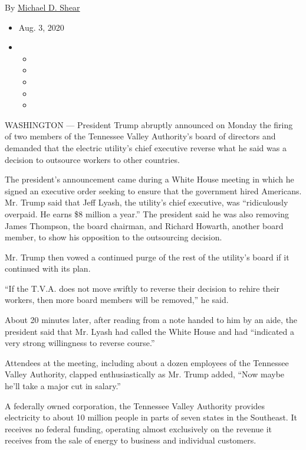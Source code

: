 By \href{https://www.nytimes3xbfgragh.onion/by/michael-d-shear}{Michael
D. Shear}

\begin{itemize}
\item
  Aug. 3, 2020
\item
  \begin{itemize}
  \item
  \item
  \item
  \item
  \item
  \end{itemize}
\end{itemize}

WASHINGTON --- President Trump abruptly announced on Monday the firing
of two members of the Tennessee Valley Authority's board of directors
and demanded that the electric utility's chief executive reverse what he
said was a decision to outsource workers to other countries.

The president's announcement came during a White House meeting in which
he signed an executive order seeking to ensure that the government hired
Americans. Mr. Trump said that Jeff Lyash, the utility's chief
executive, was ``ridiculously overpaid. He earns \$8 million a year.''
The president said he was also removing James Thompson, the board
chairman, and Richard Howarth, another board member, to show his
opposition to the outsourcing decision.

Mr. Trump then vowed a continued purge of the rest of the utility's
board if it continued with its plan.

``If the T.V.A. does not move swiftly to reverse their decision to
rehire their workers, then more board members will be removed,'' he
said.

About 20 minutes later, after reading from a note handed to him by an
aide, the president said that Mr. Lyash had called the White House and
had ``indicated a very strong willingness to reverse course.''

Attendees at the meeting, including about a dozen employees of the
Tennessee Valley Authority, clapped enthusiastically as Mr. Trump added,
``Now maybe he'll take a major cut in salary.''

A federally owned corporation, the Tennessee Valley Authority provides
electricity to about 10 million people in parts of seven states in the
Southeast. It receives no federal funding, operating almost exclusively
on the revenue it receives from the sale of energy to business and
individual customers.


